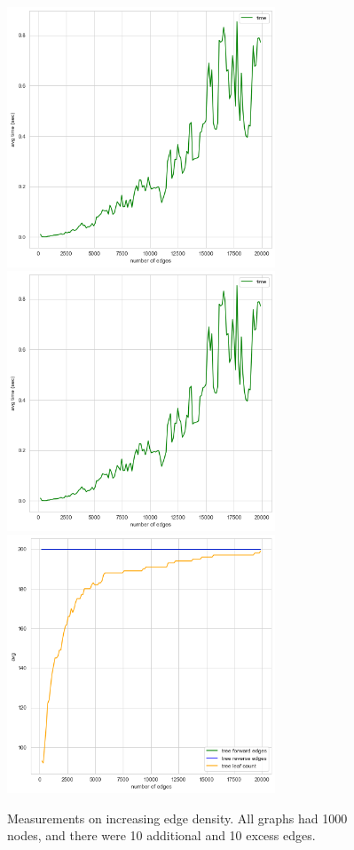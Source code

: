 \documentclass{article}
\begin{document}
\begin{landscape}
\begin{figure}
  \includegraphics[width=8cm]{figures/random_uj/edge_time.png}
  \hspace{1cm}
  \includegraphics[width=8cm]{figures/random_uj/edge_time.png}
  \hspace{1cm}
  \includegraphics[width=8cm]{figures/random_uj/edge_tree.png}

  \caption{Measurements on increasing edge density. All graphs had 1000 nodes, and there were 10 additional and 10 excess edges.}
  \label{fig:edge-density}
\end{figure}
\end{landscape}
\end{document}
